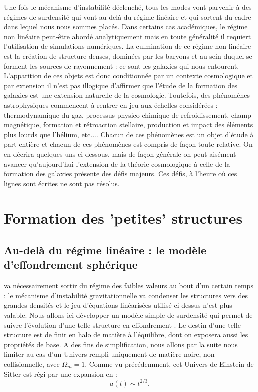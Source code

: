 Une fois le mécanisme d'instabilité déclenché, tous les modes vont parvenir à des régimes de surdensité qui vont au delà du régime linéaire et qui sortent du cadre dans lequel nous nous sommes placés. Dans certains cas académiques, le régime non linéaire peut-être abordé analytiquement mais en toute généralité il requiert l'utilisation de simulations numériques. La culmination de ce régime non linéaire est la création de structure denses, dominées par les baryons et au sein duquel se forment les sources de rayonnement : ce sont les galaxies qui nous entourent. L'apparition de ces objets est donc conditionnée par un contexte cosmologique et par extension il n'est pas illogique d'affirmer que l'étude de la formation des galaxies est une extension naturelle de la cosmologie. Toutefois, des phénomènes astrophysiques commencent à rentrer en jeu aux échelles considérées : thermodynamique du gaz, processus physico-chimique de refroidissement, champ magnétique, formation et rétroaction stellaire, production et impact des éléments plus lourds que l'hélium, etc.... Chacun de ces phénomènes est un objet d'étude à part entière et chacun de ces phénomènes est compris de façon toute relative. On en décrira quelques-uns ci-dessous, mais de façon générale on peut aisément avancer qu'aujourd'hui l'extension de la théorie cosmologique à celle de la formation des galaxies présente des défis majeurs. Ces défis, à l'heure où ces lignes sont écrites ne sont pas résolus.

\chapter{Formation des 'petites' structures}

\section{Au-delà du régime linéaire : le modèle d'effondrement sphérique}

 va nécessairement sortir du régime des faibles valeurs au bout d'un certain temps : le mécanisme d'instabilité gravitationnelle va condenser les structures vers des grandes densités et le jeu d'équations linéarisées utilisé ci-dessus n'est plus valable. Nous allons ici développer un modèle simple de surdensité qui permet de suivre l'évolution d'une telle structure en effondrement . Le destin d'une telle structure est de finir en halo de matière à l'équilibre, dont on exposera aussi les propriétés de base. A des fins de simplification, nous allons par la suite nous limiter au cas d'un Univers rempli uniquement de matière noire, non-collisionnelle, avec $\Omega_m=1$. Comme vu précédemment, cet Univers de Einstein-de Sitter est régi par une expansion en :
\begin{equation}
a(t) \sim t^{2/3}.
\end{equation}

